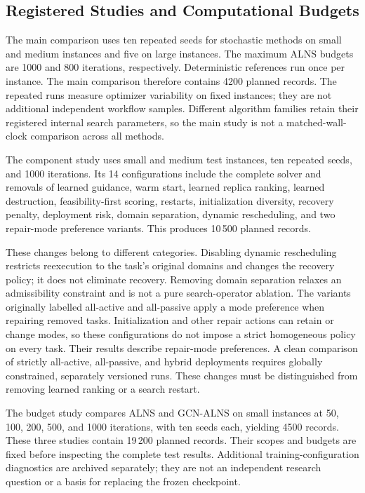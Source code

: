\subsection{Registered Studies and Computational Budgets}
The main comparison uses ten repeated seeds for stochastic methods on small
and medium instances and five on large instances. The maximum ALNS budgets
are 1000 and 800 iterations, respectively. Deterministic references run once
per instance. The main comparison therefore contains 4200 planned records.
The repeated runs measure optimizer variability on fixed instances; they are
not additional independent workflow samples. Different algorithm families
retain their registered internal search parameters, so the main study is
not a matched-wall-clock comparison across all methods.

The component study uses small and medium test instances, ten repeated
seeds, and 1000 iterations. Its 14 configurations include the complete solver
and removals of learned guidance, warm start, learned replica ranking,
learned destruction, feasibility-first scoring, restarts, initialization
diversity, recovery penalty, deployment risk, domain separation, dynamic
rescheduling, and two repair-mode preference variants. This produces
10\,500 planned records.

These changes belong to different categories. Disabling dynamic rescheduling
restricts reexecution to the task's original domains and changes the recovery
policy; it does not eliminate recovery. Removing domain separation relaxes
an admissibility constraint and is not a pure search-operator ablation.
The variants originally labelled all-active and all-passive apply a mode
preference when repairing removed tasks. Initialization and other repair
actions can retain or change modes, so these configurations do not impose a
strict homogeneous policy on every task. Their results describe repair-mode
preferences. A clean comparison of strictly all-active, all-passive, and
hybrid deployments requires globally constrained, separately versioned runs.
These changes must be distinguished from removing learned ranking or a search
restart.

The budget study compares ALNS and GCN-ALNS on small instances at 50, 100,
200, 500, and 1000 iterations, with ten seeds each, yielding 4500 records.
These three studies contain 19\,200 planned records. Their scopes and budgets
are fixed before inspecting the complete test results. Additional
training-configuration diagnostics are archived separately; they are not an
independent research question or a basis for replacing the frozen checkpoint.

